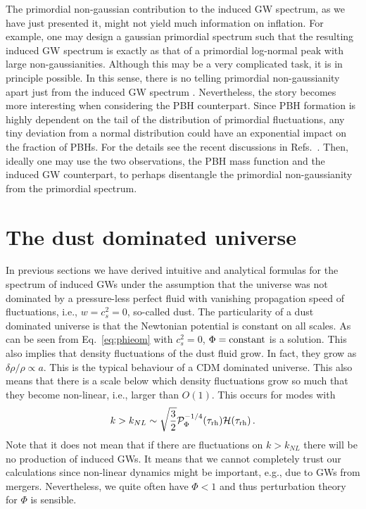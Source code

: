 \documentclass[a4paper,11pt]{article}
\numberwithin{equation}{section}
\begin{document}
The primordial non-gaussian contribution to the induced GW spectrum, as we have just presented it, might not yield much information on inflation. For example, one may design a gaussian primordial spectrum such that the resulting induced GW spectrum is exactly as that of a primordial log-normal peak with large non-gaussianities. Although this may be a very complicated task, it is in principle possible. In this sense, there is no telling primordial non-gaussianity apart just from the induced GW spectrum \cite{Yuan:2021qgz}. Nevertheless, the story becomes more interesting when considering the PBH counterpart. Since PBH formation is highly dependent on the tail of the distribution of primordial fluctuations, any tiny deviation from a normal distribution could have an exponential impact on the fraction of PBHs. For the details see the recent discussions in Refs.~\cite{Young:2013oia,Yoo:2019pma,Atal:2018neu,Atal:2019cdz,Kehagias:2019eil,Young:2019yug,DeLuca:2019qsy,Kawasaki:2019mbl,Riccardi:2021rlf}. Then, ideally one may use the two observations, the PBH mass function and the induced GW counterpart, to perhaps disentangle the primordial non-gaussianity from the primordial spectrum. 



\section{The dust dominated universe \label{sec:dust}}

In previous sections we have derived intuitive and analytical formulas for the spectrum of induced GWs under the assumption that the universe was not dominated by a pressure-less perfect fluid with vanishing propagation speed of fluctuations, i.e., $w=c_s^2=0$, so-called dust. The particularity of a dust dominated universe is that the Newtonian potential is constant on all scales. As can be seen from Eq.~\eqref{eq:phieom} with $c_s^2=0$, $\Phi={\rm constant}$ is a solution. This also implies that density fluctuations of the dust fluid grow. In fact, they grow as $\delta\rho/\rho\propto a$. This is the typical behaviour of a CDM dominated universe. This also means that there is a scale below which density fluctuations grow so much that they become non-linear, i.e., larger than $O(1)$. This occurs for modes with \cite{Assadullahi:2009nf}
\begin{align}\label{eq:kNL}
k>k_{NL}\sim \sqrt{\frac{3}{2}}{\cal P}^{-1/4}_{\Phi}(\tau_{\rm rh}){\cal H}(\tau_{\rm rh})\,.
\end{align}
Note that it does not mean that if there are fluctuations on $k>k_{NL}$ there will be no production of induced GWs. It means that we cannot completely trust our calculations since non-linear dynamics might be important, e.g., due to GWs from mergers. Nevertheless, we quite often have $\Phi<1$ and thus perturbation theory for $\Phi$ is sensible. 
\end{document}
